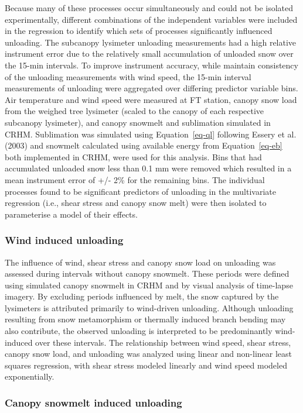 \documentclass[
  letterpaper,
  DIV=11,
  numbers=noendperiod]{scrartcl}
\begin{document}
Because many of these processes occur simultaneously and could not be
isolated experimentally, different combinations of the independent
variables were included in the regression to identify which sets of
processes significantly influenced unloading. The subcanopy lysimeter
unloading measurements had a high relative instrument error due to the
relatively small accumulation of unloaded snow over the 15-min
intervals. To improve instrument accuracy, while maintain consistency of
the unloading measurements with wind speed, the 15-min interval
measurements of unloading were aggregated over differing predictor
variable bins. Air temperature and wind speed were measured at FT
station, canopy snow load from the weighed tree lysimeter (scaled to the
canopy of each respective subcanopy lysimeter), and canopy snowmelt and
sublimation simulated in CRHM. Sublimation was simulated using
Equation~\ref{eq-ql} following Essery et al. (2003) and snowmelt
calculated using available energy from Equation~\ref{eq-eb} both
implemented in CRHM, were used for this analysis. Bins that had
accumulated unloaded snow less than 0.1 mm were removed which resulted
in a mean instrument error of +/- 2\% for the remaining bins. The
individual processes found to be significant predictors of unloading in
the multivariate regression (i.e., shear stress and canopy snow melt)
were then isolated to parameterise a model of their effects.

\subsubsection{Wind induced unloading}\label{wind-induced-unloading}

The influence of wind, shear stress and canopy snow load on unloading
was assessed during intervals without canopy snowmelt. These periods
were defined using simulated canopy snowmelt in CRHM and by visual
analysis of time-lapse imagery. By excluding periods influenced by melt,
the snow captured by the lysimeters is attributed primarily to
wind-driven unloading. Although unloading resulting from snow
metamorphism or thermally induced branch bending may also contribute,
the observed unloading is interpreted to be predominantly wind-induced
over these intervals. The relationship between wind speed, shear stress,
canopy snow load, and unloading was analyzed using linear and non-linear
least squares regression, with shear stress modeled linearly and wind
speed modeled exponentially.

\subsubsection{Canopy snowmelt induced
unloading}\label{canopy-snowmelt-induced-unloading}
\end{document}
